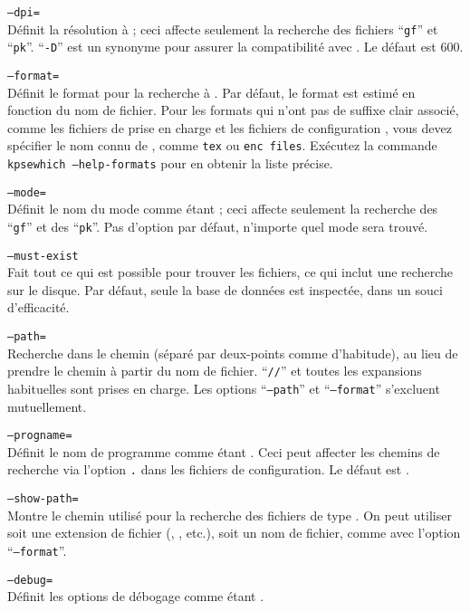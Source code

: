 \documentclass[german, english, french, 12pt]{article}
\renewcommand{\samp}[1]{\enquote{\texttt{#1}}}
\begin{document}
\begin{ttdescription}
\item[\texttt{--dpi=\var{num}}]\mbox{} \\
  Définit la résolution à  ; ceci affecte seulement la recherche des
  fichiers \samp{gf} et \samp{pk}. \samp{-D} est un synonyme pour assurer la
  compatibilité avec . Le défaut est 600.
\item[\texttt{--format=\var{name}}]\mbox{}\\
  Définit le format pour la recherche à .  Par défaut, le format est
  estimé en fonction du nom de fichier.  Pour les formats qui n'ont pas de
  suffixe clair associé, comme les fichiers de prise en charge \MP{} et les
  fichiers de configuration , vous devez spécifier le nom connu
  de \KPS, comme \texttt{tex} ou \texttt{enc files}. Exécutez la commande
  \texttt{kpsewhich --help-formats} pour en obtenir la liste précise.

\item[\texttt{--mode=\var{string}}]\mbox{}\\
  Définit le nom du mode comme étant  ; ceci affecte seulement la
  recherche des \samp{gf} et des \samp{pk}.  Pas d'option par défaut, n'importe
  quel mode sera trouvé.
\item[\texttt{--must-exist}]\mbox{}\\
  Fait tout ce qui est possible pour trouver les fichiers, ce qui inclut une
  recherche sur le disque. Par défaut, seule la base de données  est
  inspectée, dans un souci d'efficacité.
\item[\texttt{--path=\var{string}}]\mbox{}\\
  Recherche dans le chemin  (séparé par deux-points comme
  d'habitude), au lieu de prendre le chemin à partir du nom de
  fichier. \samp{//} et toutes les expansions habituelles sont prises en charge.
  Les options \samp{--path} et \samp{--format} s'excluent mutuellement.
\item[\texttt{--progname=\var{name}}]\mbox{}\\
  Définit le nom de programme comme étant .  Ceci peut affecter les
  chemins de recherche via l'option \texttt{.} dans les fichiers
  de configuration.  Le défaut est .
\item[\texttt{--show-path=\var{name}}]\mbox{}\\
  Montre le chemin utilisé pour la recherche des fichiers de type .
  On peut utiliser soit une extension de fichier (, , etc.),
  soit un nom de fichier, comme avec l'option \samp{--format}.
\item[\texttt{--debug=\var{num}}]\mbox{}\\
  Définit les options de débogage comme étant .
\end{ttdescription}
\end{document}
